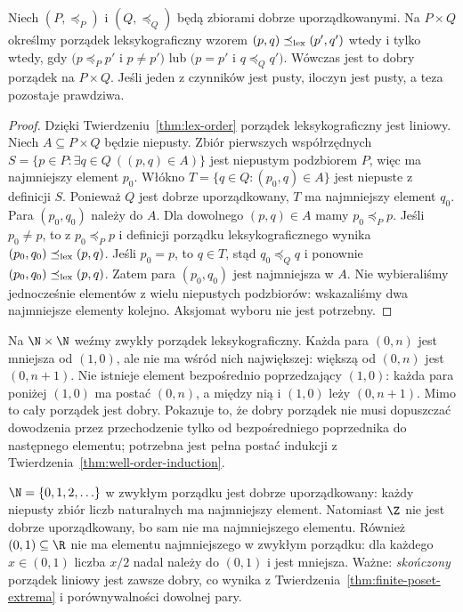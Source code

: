 \begin{twierdzenie}
\label{thm:lex-well-orders-xliii}
Niech $(P,\preceq_P)$ i $(Q,\preceq_Q)$ będą zbiorami
dobrze uporządkowanymi. Na $P\times Q$ określmy
porządek leksykograficzny wzorem
$(p,q)\preceq_{\rm lex}(p',q')$ wtedy i tylko wtedy, gdy
$(p\preceq_P p'$ i $p\ne p')$ lub
$(p=p'$ i $q\preceq_Q q')$.
Wówczas jest to dobry porządek na $P\times Q$.
Jeśli jeden z czynników jest pusty, iloczyn jest pusty,
a teza pozostaje prawdziwa.
\end{twierdzenie}
\begin{proof}
Dzięki Twierdzeniu~\ref{thm:lex-order} porządek
leksykograficzny jest liniowy. Niech
$A\subseteq P\times Q$ będzie niepusty.
Zbiór pierwszych współrzędnych
$S=\{p\in P:\exists q\in Q\ ((p,q)\in A)\}$
jest niepustym podzbiorem $P$, więc ma najmniejszy
element $p_0$. Włókno
$T=\{q\in Q:(p_0,q)\in A\}$ jest niepuste z definicji $S$.
Ponieważ $Q$ jest dobrze uporządkowany, $T$ ma najmniejszy
element $q_0$. Para $(p_0,q_0)$ należy do $A$.
Dla dowolnego $(p,q)\in A$ mamy $p_0\preceq_P p$.
Jeśli $p_0\ne p$, to z $p_0\preceq_P p$ i definicji
porządku leksykograficznego wynika
$(p_0,q_0)\preceq_{\rm lex}(p,q)$. Jeśli $p_0=p$,
to $q\in T$, stąd $q_0\preceq_Q q$ i ponownie
$(p_0,q_0)\preceq_{\rm lex}(p,q)$.
Zatem para $(p_0,q_0)$ jest najmniejsza w $A$.
Nie wybieraliśmy jednocześnie elementów z wielu
niepustych podzbiorów: wskazaliśmy dwa najmniejsze
elementy kolejno. Aksjomat wyboru nie jest potrzebny.
\end{proof}
\begin{przyklad}
\label{ex:lex-no-predecessor-xliii}
Na $\N\times\N$ weźmy zwykły porządek leksykograficzny.
Każda para $(0,n)$ jest mniejsza od $(1,0)$, ale nie
ma wśród nich największej: większą od $(0,n)$ jest
$(0,n+1)$. Nie istnieje element bezpośrednio poprzedzający $(1,0)$:
każda para poniżej $(1,0)$ ma postać $(0,n)$,
a między nią i $(1,0)$ leży $(0,n+1)$.
Mimo to cały porządek jest dobry. Pokazuje to, że
dobry porządek nie musi dopuszczać dowodzenia przez
przechodzenie tylko od bezpośredniego poprzednika
do następnego elementu; potrzebna jest pełna postać
indukcji z Twierdzenia~\ref{thm:well-order-induction}.
\end{przyklad}



\begin{przyklad}
$\N=\{0,1,2,\ldots\}$ w zwykłym porządku jest dobrze
uporządkowany: każdy niepusty zbiór liczb naturalnych
ma najmniejszy element. Natomiast $\Z$ nie jest dobrze
uporządkowany, bo sam nie ma najmniejszego elementu.
Również $(0,1)\subseteq\R$ nie ma elementu
najmniejszego w zwykłym porządku: dla każdego $x\in(0,1)$
liczba $x/2$ nadal należy do $(0,1)$ i jest mniejsza.
Ważne: \emph{skończony} porządek liniowy jest zawsze dobry,
co wynika z Twierdzenia~\ref{thm:finite-poset-extrema}
i porównywalności dowolnej pary.
\end{przyklad}

